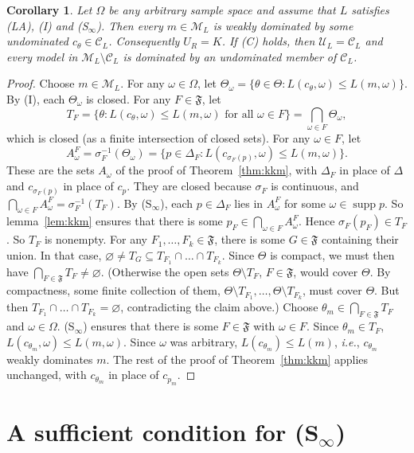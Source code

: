 \documentclass[11pt]{article}
\newtheorem{corollary}[theorem]{Corollary}
\theoremstyle{definition}
\theoremstyle{remark}
\newcommand{\M}{\mathcal M}
\newcommand{\C}{\mathcal C}
\newcommand{\F}{\mathfrak F}
\newcommand{\U}{\mathcal U}
\newcommand{\supp}{\operatorname{supp}}
\begin{document}
\begin{corollary}\label{cor:infinite}
Let $\Omega$ be any arbitrary sample space and assume that $L$ satisfies (LA), (I) and (S$_\infty$). Then every $m\in\M_L$ is weakly dominated by some undominated $c_\theta\in\C_L$. Consequently $U_R=K$. If (C) holds, then $\U_L=\C_L$ and every model in $\M_L\setminus\C_L$ is dominated by an undominated member of $\C_L$. 
\end{corollary}
\begin{proof}
Choose $m\in\M_L$. For any $\omega\in\Omega$, let $\Theta_\omega=\{\theta\in\Theta:L(c_\theta,\omega)\le L(m,\omega)\}$. By (I), each $\Theta_\omega$ is closed\textcolor{red}{}. For any $F\in\F$, let
\[
 T_F=\{\theta:L(c_\theta,\omega)\le L(m,\omega)\text{ for all }\omega\in F\} = \bigcap_{\omega\in F}\Theta_\omega,
\]
which is closed (as a finite intersection of closed sets). For any $\omega\in F$, let 
\[
A^F_\omega=\sigma_F^{-1}(\Theta_\omega)=\{p\in\Delta_F:L(c_{\sigma_F(p)},\omega)\le L(m,\omega)\}.
\]
These are the sets $A_\omega$ of the proof of Theorem~\ref{thm:kkm}, with $\Delta_F$ in place of $\Delta$ and $c_{\sigma_F(p)}$ in place of $c_p$. They are closed because $\sigma_F$ is continuous, and $\bigcap_{\omega\in F}A^F_\omega=\sigma_F^{-1}(T_F)$. By (S$_\infty$), each $p\in\Delta_F$ lies in $A^F_\omega$ for some $\omega\in\supp p$. So lemma~\ref{lem:kkm} ensures that there is some $p_F\in\bigcap_{\omega\in F}A^F_\omega$. Hence $\sigma_F(p_F)\in T_F$. So $T_F$ is nonempty. For any $F_1,\dots,F_k\in\F$, there is some $G\in\F$ containing their union. In that case, $\varnothing\ne T_G\subseteq T_{F_1}\cap\dots\cap T_{F_k}$. Since $\Theta$ is compact, we must then have $\bigcap_{F\in\F}T_F\neq \varnothing$. (Otherwise the open sets $\Theta\setminus T_F$, $F\in\F$, would cover $\Theta$. By compactness, some finite collection of them, $\Theta\setminus T_{F_1},\dots,\Theta\setminus T_{F_k}$, must cover $\Theta$. But then $T_{F_1}\cap\dots\cap T_{F_k}=\varnothing$, contradicting the claim above.) Choose $\theta_m\in\bigcap_{F\in\F}T_F$ and $\omega\in\Omega$. (S$_\infty$) ensures that there is some $F\in\F$ with $\omega\in F$. Since $\theta_m\in T_F$, $L(c_{\theta_m},\omega)\le L(m,\omega)$. Since $\omega$ was arbitrary, $L(c_{\theta_m})\le L(m)$, \textit{i.e.}, $c_{\theta_m}$ weakly dominates $m$. The rest of the proof of Theorem~\ref{thm:kkm} applies unchanged, with $c_{\theta_m}$ in place of $c_{p_m}$.
\end{proof}




\section{A sufficient condition for (S$_\infty$)}\label{sec:strict}
\end{document}
